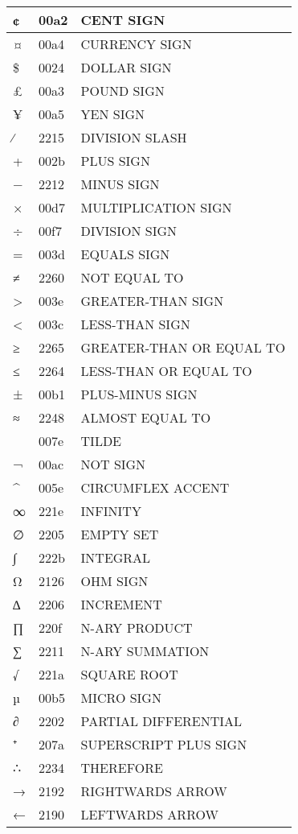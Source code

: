 \documentclass[12pt,letterpaper,openany]{book}
\begin{document}
\begin{center}
\begin{supertabular}{|m{0.25in}|m{0.5in}|m{4in}|}
¢ & 00a2 & CENT SIGN\\\hline
¤ & 00a4 & CURRENCY SIGN\\\hline
\$ & 0024 & DOLLAR SIGN\\\hline
£ & 00a3 & POUND SIGN\\\hline
¥ & 00a5 & YEN SIGN\\\hline
∕ & 2215 & DIVISION SLASH\\\hline
+ & 002b & PLUS SIGN\\\hline
− & 2212 & MINUS SIGN\\\hline
× & 00d7 & MULTIPLICATION SIGN\\\hline
÷ & 00f7 & DIVISION SIGN\\\hline
= & 003d & EQUALS SIGN\\\hline
≠ & 2260 & NOT EQUAL TO\\\hline
> & 003e & GREATER-THAN SIGN\\\hline
< & 003c & LESS-THAN SIGN\\\hline
≥ & 2265 & GREATER-THAN OR EQUAL TO\\\hline
≤ & 2264 & LESS-THAN OR EQUAL TO\\\hline
± & 00b1 & PLUS-MINUS SIGN\\\hline
≈ & 2248 & ALMOST EQUAL TO\\\hline
~ & 007e & TILDE\\\hline
¬ & 00ac & NOT SIGN\\\hline
\^ & 005e & CIRCUMFLEX ACCENT\\\hline
∞ & 221e & INFINITY\\\hline
∅ & 2205 & EMPTY SET\\\hline
∫ & 222b & INTEGRAL\\\hline
Ω & 2126 & OHM SIGN\\\hline
∆ & 2206 & INCREMENT\\\hline
∏ & 220f & N-ARY PRODUCT\\\hline
∑ & 2211 & N-ARY SUMMATION\\\hline
√ & 221a & SQUARE ROOT\\\hline
µ & 00b5 & MICRO SIGN\\\hline
∂ & 2202 & PARTIAL DIFFERENTIAL\\\hline
⁺ & 207a & SUPERSCRIPT PLUS SIGN\\\hline
∴ & 2234 & THEREFORE\\\hline
→ & 2192 & RIGHTWARDS ARROW\\\hline
← & 2190 & LEFTWARDS ARROW\\\hline

\end{supertabular}
\end{center}
\end{document}
